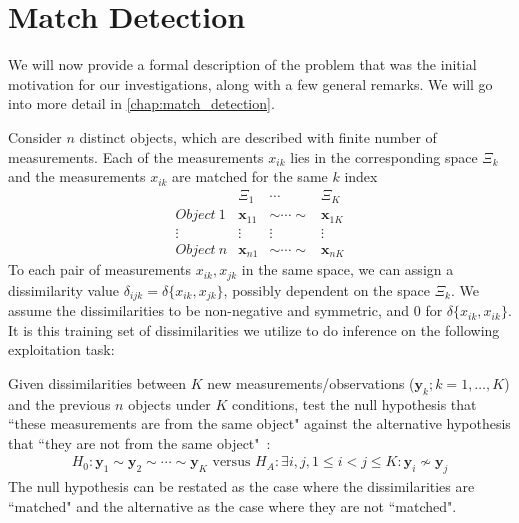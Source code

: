 \documentclass[12pt,oneside,final]{thesis}\usepackage[]{graphicx}\usepackage[]{color}
\begin{document}
\section{Match Detection}

We will now provide a formal description of the problem that was the initial motivation for our investigations, along with a few general remarks. We will go into more detail in  \ref{chap:match_detection}.

Consider $n$  distinct objects, which are described with finite number of measurements. Each of the measurements $x_{ik}$ lies in  the corresponding space $\Xi_k$ and the  measurements $x_{ik}$ are matched for the same $k$ index
\[  \begin{array}{cccc}
        & \Xi_1 & \cdots & \Xi_K\\
        Object ~ 1 & \bm{x}_{11} & \sim \cdots \sim & \bm{x}_{1K} \\
        \vdots & \vdots & \vdots & \vdots \\
        Object ~ n & \bm{x}_{n1} & \sim \cdots \sim & \bm{x}_{nK}
      \end{array}      
\]
To each pair of measurements $x_{ik},x_{jk}$ in the same space, we can assign a dissimilarity value $\delta_{ijk}=\delta\{x_{ik},x_{jk}\}$, possibly dependent on the space $\Xi_k$. We assume the dissimilarities to be non-negative and  symmetric, and 0 for $\delta\{x_{ik},x_{ik}\}$.  It is this training set of  dissimilarities we utilize to do inference on the following exploitation task:

 Given dissimilarities between  $K$ new measurements/observations ($\bm{y}_{k};k=1,\ldots,K$) and the previous $n$ objects under $K$ conditions, 
test the null hypothesis  that ``these measurements are from the same  object"  against the alternative hypothesis that ``they are not  from the same  object"~\cite{JOFC}:
    \[
\begin{array}{l}
    H_0: \bm{y}_{1} \sim \bm{y}_{2} \sim \cdots \sim \bm{y}_{K}
 \text{ versus } 
 H_A: \exists i, j , 1\leq i < j \leq K :\bm{y}_{i} \nsim \bm{y}_{j}  
\end{array}
\]
 The null hypothesis can be restated as the case where the dissimilarities are ``matched" and the alternative as the case where they are not ``matched".
\end{document}
